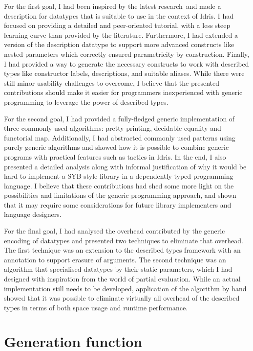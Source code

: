\documentclass{ituthesis}
\theoremstyle{break}
\begin{document}
For the first goal, I had been inspired by the latest research\,\autocite{Chapman:2010:GAL:1863543.1863547,Dagand2013acosmology,diehl2014eliminators} and made a description for datatypes that is suitable to use in the context of Idris.
I had focused on providing a detailed and peer-oriented tutorial, with a less steep learning curve than provided by the literature.
Furthermore, I had extended a version of the description datatype to support more advanced constructs like nested parameters which correctly ensured parametricity by construction.
Finally, I had provided a way to generate the necessary constructs to work with described types like constructor labels, descriptions, and suitable aliases.
While there were still minor usability challenges to overcome, I believe that the presented contributions should make it easier for programmers inexperienced with generic programming to leverage the power of described types.

For the second goal, I had provided a fully-fledged generic implementation of three commonly used algorithms: pretty printing, decidable equality and functorial map.
Additionally, I had abstracted commonly used patterns using purely generic algorithms and showed how it is possible to combine generic programs with practical features such as tactics in Idris.
In the end, I also presented a detailed analysis along with informal justification of why it would be hard to implement a SYB-style library in a dependently typed programming language.
I believe that these contributions had shed some more light on the possibilities and limitations of the generic programming approach, and shown that it may require some considerations for future library implementers and language designers.

For the final goal, I had analysed the overhead contributed by the generic encoding of datatypes and presented two techniques to eliminate that overhead.
The first technique was an extension to the described types framework with an annotation to support erasure of arguments.
The second technique was an algorithm that specialised datatypes by their static parameters, which I had designed with inspiration from the world of partial evaluation.
While an actual implementation still needs to be developed, application of the algorithm by hand showed that it was possible to eliminate virtually all overhead of the described types in terms of both space usage and runtime performance.

\printbibliography

\chapter{Generation function}
\label{cha:Generation function}

\end{document}
